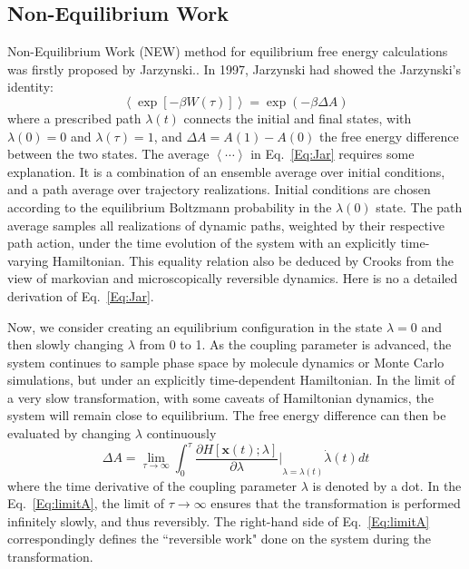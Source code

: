 \subsection{Non-Equilibrium Work\label{Sec:FEM:NEW}}
Non-Equilibrium Work (NEW) method for equilibrium free energy calculations was firstly proposed by Jarzynski.\cite{JarzynskiPRL1997}. 
In 1997, Jarzynski had showed the Jarzynski's identity:
\begin{equation}
\left< \exp\left[-\beta W(\tau)\right] \right> = \exp{(-\beta \Delta A)}
\label{Eq:Jar}
\end{equation} 
where a prescribed path $\lambda(t)$ connects the initial and final states, with $\lambda(0)=0$ and $\lambda(\tau)=1$, and $\Delta A = A(1) - A(0)$ the free energy difference between the two states. The average $\left \langle \cdots \right \rangle$ in Eq.~\ref{Eq:Jar} requires some explanation. It is a combination of an ensemble average over initial conditions, and a path average over trajectory realizations. Initial conditions are chosen according to the equilibrium Boltzmann probability in the $\lambda(0)$ state. The path average samples all realizations of dynamic paths, weighted by their respective path action, under the time evolution of the system with an explicitly time-varying Hamiltonian. This equality relation also be deduced by Crooks from the view of markovian and microscopically reversible dynamics.\cite{CrooksJSP1998} Here is no a detailed derivation of Eq.~\ref{Eq:Jar}.

Now, we consider creating an equilibrium configuration in the state $\lambda=0$ and then slowly changing $\lambda$ from 0 to 1. As the coupling parameter is advanced, the system continues to sample phase space by molecule dynamics or Monte Carlo simulations, but under an explicitly time-dependent Hamiltonian. In the limit of a very slow transformation, with some caveats of Hamiltonian dynamics, the system will remain close to equilibrium. The free energy difference can then be evaluated by changing $\lambda$ continuously
\begin{equation}
\Delta A =\lim_{\tau\to\infty} \int_{0}^{\tau} {\frac{\partial{H\left[\textbf{x}(t);\lambda\right]}}{\partial{\lambda}}\bigg\rvert}_{\lambda=\lambda(t)} \dot{\lambda}(t) dt
\label{Eq:limitA}
\end{equation}  
where the time derivative of the coupling parameter $\lambda$ is denoted by a dot. In the Eq.~\ref{Eq:limitA}, the limit of $\tau\to\infty$ ensures that the transformation is performed infinitely slowly, and thus reversibly. The right-hand side of Eq.~\ref{Eq:limitA} correspondingly defines the ``reversible work" done on the system during the transformation.


